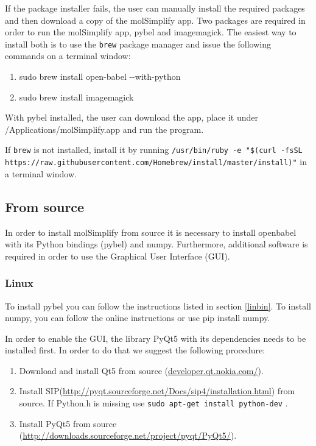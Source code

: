 \documentclass[a4paper,12pt]{assignment}
\begin{document}
If the package installer fails, the user can manually install the required packages and then download a copy of the molSimplify app. Two packages are required in order to run the molSimplify app, pybel and imagemagick. The easiest way to install both is to use the \texttt{brew} package manager and issue the following commands on a terminal window:
\begin{enumerate}
\item sudo brew install open-babel -\hspace{0.02cm}-with-python
\item sudo brew install imagemagick
\end{enumerate}

With pybel installed, the user can download the app, place it under /Applications/molSimplify.app and run the program.

If \texttt{brew} is not installed, install it by running \texttt{/usr/bin/ruby -e "\$(curl -fsSL https://raw.githubusercontent.com/Homebrew/install/master/install)"} in a terminal window.

\subsection{From source}
In order to install molSimplify from source it is necessary to install openbabel with its Python bindings (pybel) and numpy. Furthermore, additional software is required in order to use the Graphical User Interface (GUI).

\subsubsection{Linux}

To install pybel you can follow the instructions listed in section \ref{linbin}. To install numpy, you can follow the online instructions or use pip install numpy. 

In order to enable the GUI, the library PyQt5 with its dependencies needs to be installed first. In order to do that we suggest the following procedure:
\begin{enumerate}
\item Download and install Qt5 from source (\url{developer.qt.nokia.com/}). 
\item Install SIP(\url{http://pyqt.sourceforge.net/Docs/sip4/installation.html}) from source. If Python.h is missing use \texttt{sudo apt-get install python-dev} . 
\item Install PyQt5 from source (\url{http://downloads.sourceforge.net/project/pyqt/PyQt5/}).
\end{enumerate}
\end{document}
